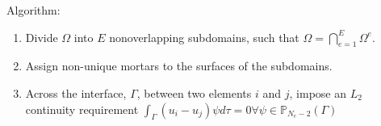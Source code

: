 Algorithm:

\begin{enumerate}
\def\labelenumi{\arabic{enumi}.}
\tightlist
\item
  Divide \(\Omega\) into \(E\) nonoverlapping subdomains, such that
  \(\Omega=\bigcap_{e=1}^{E} \Omega ^e\).
\item
  Assign non-unique mortars to the surfaces of the subdomains.
\item
  Across the interface, \(\Gamma\), between two elements \(i\) and
  \(j\), impose an \(L_2\) continuity requirement
  \(\int_{\Gamma}(u_i-u_j)\psi d\tau = 0 \forall \psi \in \mathbb{P}_{N_e-2}(\Gamma)\)
\end{enumerate}
